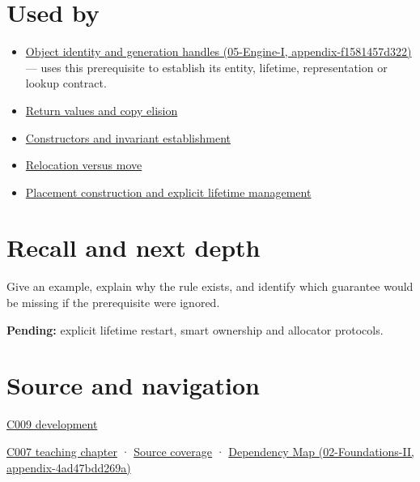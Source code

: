 \section{Used by}\label{appendix-a82f9c438857-used-by}

\begin{itemize}
\tightlist
\item
  \href{../05-Engine-I/main.pdf\#nameddest=appendix-f1581457d322}{Object identity and generation handles (05-Engine-I, appendix-f1581457d322)} --- uses this prerequisite to establish its entity, lifetime, representation or lookup contract.
\item
  \hyperref[appendix-b08d3788c5c6]{Return values and copy elision}
\item
  \hyperref[appendix-7f8ec83d0886]{Constructors and invariant establishment}
\item
  \hyperref[appendix-adfd6397af8d]{Relocation versus move}
\item
  \hyperref[appendix-f56c3e43fd4e]{Placement construction and explicit lifetime management}
\end{itemize}

\section{Recall and next depth}\label{appendix-a82f9c438857-recall-and-next-depth}

Give an example, explain why the rule exists, and identify which guarantee would be missing if the prerequisite were ignored.

\textbf{Pending:} explicit lifetime restart, smart ownership and allocator protocols.

\section{Source and navigation}\label{appendix-a82f9c438857-source-and-navigation}

\hyperref[appendix-fd090d982a15-m009---parts-127-147]{C009 development}

\href{Continuous\%20Notes/Computing\%20Foundations\%20-\%20From\%20Bits\%20to\%20C++\%20and\%20Systems\%20APIs\#Storage\%20is\%20a\%20place;\%20an\%20object\%20is\%20its\%20occupant}{C007 teaching chapter} · \hyperref[appendix-fd090d982a15-m007---parts-101-112]{Source coverage} · \href{../02-Foundations-II/main.pdf\#nameddest=appendix-4ad47bdd269a}{Dependency Map (02-Foundations-II, appendix-4ad47bdd269a)}
